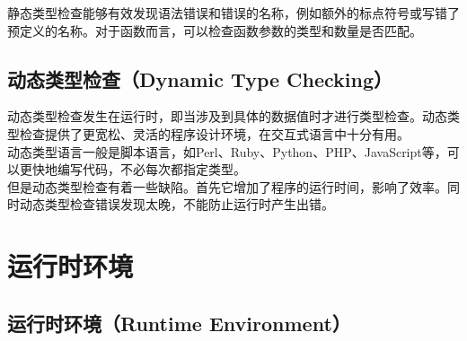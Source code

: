 静态类型检查能够有效发现语法错误和错误的名称，例如额外的标点符号或写错了预定义的名称。对于函数而言，可以检查函数参数的类型和数量是否匹配。\\

\subsection{动态类型检查（Dynamic Type Checking）}

动态类型检查发生在运行时，即当涉及到具体的数据值时才进行类型检查。动态类型检查提供了更宽松、灵活的程序设计环境，在交互式语言中十分有用。\\

动态类型语言一般是脚本语言，如Perl、Ruby、Python、PHP、JavaScript等，可以更快地编写代码，不必每次都指定类型。\\

但是动态类型检查有着一些缺陷。首先它增加了程序的运行时间，影响了效率。同时动态类型检查错误发现太晚，不能防止运行时产生出错。

\newpage

\section{运行时环境}

\subsection{运行时环境（Runtime Environment）}

